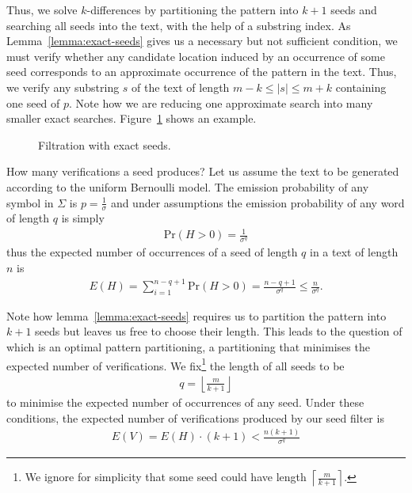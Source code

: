 Thus, we solve $k$-differences by partitioning the pattern into $k+1$ seeds and searching all seeds into the text, \eg with the help of a substring index.
As Lemma~\ref{lemma:exact-seeds} gives us a necessary but not sufficient condition, we must verify whether any candidate location induced by an occurrence of some seed corresponds to an approximate occurrence of the pattern in the text.
Thus, we verify any substring $s$ of the text of length $m - k \leq |s| \leq m + k$ containing one seed of $p$.
Note how we are reducing one approximate search into many smaller exact searches.
Figure~\ref{fig:seeds-ext} shows an example.

\begin{figure}[h]
\begin{center}
\caption{Filtration with exact seeds.}
\label{fig:seeds-ext}

\end{center}
\end{figure}

How many verifications a seed produces?
Let us assume the text to be generated according to the uniform Bernoulli model.
The emission probability of any symbol in $\Sigma$ is $p = \frac{1}{\sigma}$ and under \iid assumptions the emission probability of any word of length $q$ is simply
\begin{eqnarray}
\text{Pr}(H > 0) = \frac{1}{\sigma^q}
\end{eqnarray}
thus the expected number of occurrences of a seed of length $q$ in a text of length $n$ is
\begin{eqnarray}
E(H) = \sum_{i=1}^{n-q+1}{\text{Pr}(H > 0)} = \frac{n - q + 1}{\sigma^q} \leq \frac{n}{\sigma^q}.
\end{eqnarray}

Note how lemma~\ref{lemma:exact-seeds} requires us to partition the pattern into $k+1$ seeds but leaves us free to choose their length.
This leads to the question of which is an optimal pattern partitioning, \ie a partitioning that minimises the expected number of verifications.
We fix\footnote{We ignore for simplicity that some seed could have length $\left \lceil \frac{m}{k+1} \right \rceil$.} the length of all seeds to be
\begin{eqnarray}
\label{eq:seed-len}
q=\left \lfloor \frac{m}{k+1} \right \rfloor
\end{eqnarray}
to minimise the expected number of occurrences of any seed.
Under these conditions, the expected number of verifications produced by our seed filter is
\begin{eqnarray}
E(V) = E(H) \cdot (k + 1) < \frac{n (k + 1)}{\sigma^q}
\end{eqnarray}

